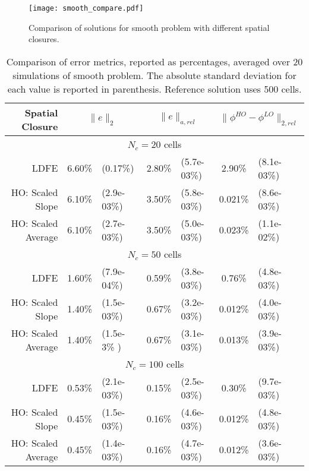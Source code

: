 \begin{figure}[H]
    \centering
    \texttt{[image: smooth\_compare.pdf]}
    \caption{\label{fig:smooth_compare} Comparison of solutions for smooth problem with different spatial closures.}
\end{figure}

\begin{table}[H]
    \caption{\label{tab:smooth} Comparison of error metrics, reported as percentages, averaged over 20 simulations of smooth problem.  The absolute
standard deviation for each value is reported in parenthesis. Reference solution uses 500 cells.}
    \begin{tabular}{|r|cl|cl|cl|} \hline
        Spatial Closure & \multicolumn{2}{|c|}{$\|e\|_2$}  &
        \multicolumn{2}{|c|}{$\|e\|_{a,rel}$} & \multicolumn{2}{|c|}{$\|\phi^{HO}
        -\phi^{LO}\|_{2,rel}$} \\  \hline \hline
        \multicolumn{7}{|c|}{$N_c = 20$ cells} \\ \hline
LDFE               &   6.60\%  &   (0.17\%)  &   2.80\%     &   (5.7e-03\%)  &   2.90\%   &  (8.1e-03\%)  \\
HO: Scaled Slope   &   6.10\%  &   (2.9e-03\%)  &   3.50\%  &   (5.8e-03\%)  &   0.021\%  &  (8.6e-03\%)  \\
HO: Scaled Average &   6.10\%  &   (2.7e-03\%)  &   3.50\%  &   (5.0e-03\%)  &   0.023\%  &  (1.1e-02\%)  \\ \hline
       \multicolumn{7}{|c|}{$N_c  = 50$ cells}   \\ \hline
LDFE               &   1.60\%  &   (7.9e-04\%)  &   0.59\%  &   (3.8e-03\%)  &   0.76\%  &  (4.8e-03\%)  \\
HO: Scaled Slope   &   1.40\%  &   (1.5e-03\%)  &   0.67\%  &   (3.2e-03\%)  &   0.012\%  &  (4.0e-03\%)  \\
HO: Scaled Average &   1.40\%  &   (1.5e-3\% ) &   0.67\%   &   (3.1e-03\%)  &   0.013\%  &  (3.9e-03\%)  \\ \hline
       \multicolumn{7}{|c|}{$N_c  = 100$ cells}   \\ \hline
LDFE               &   0.53\%  &   (2.1e-03\%)  &   0.15\%  &   (2.5e-03\%)  &   0.30\%  &  (9.7e-03\%)  \\
HO: Scaled Slope   &   0.45\%  &   (1.5e-03\%)  &   0.16\%  &   (4.6e-03\%)  &   0.012\%  &  (4.8e-03\%)  \\
HO: Scaled Average &   0.45\%  &   (1.4e-03\%)  &   0.16\%  &   (4.7e-03\%)  &   0.012\%  &  (3.6e-03\%)  \\ \hline
    \end{tabular}
\end{table}

